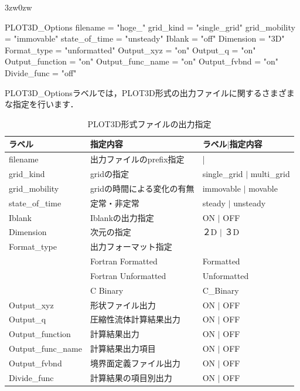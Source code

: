 \begin{indentation}{3zw}{0zw}
\small

\begin{program}
  PLOT3D_Options {
    filename       = "hoge_"
    grid_kind      = "single_grid"
    grid_mobility  = "immovable"
    state_of_time  = "unsteady"
    Iblank         = "off"
    Dimension      = "3D"
    Format_type    = "unformatted"
    Output_xyz       = "on"
    Output_q         = "on"
    Output_function  = "on"
    Output_func_name = "on"
    Output_fvbnd     = "on"
    Divide_func      = "off"
  }
\end{program}


PLOT3D\_Optionsラベルでは，PLOT3D形式の出力ファイルに関するさまざまな指定を行います．


\begin{table}[htdp]
\caption{PLOT3D形式ファイルの出力指定}
\begin{center}
\small
\begin{tabular}{lll} \toprule
ラベル & 指定内容 & ラベル$|$指定内容\\ \midrule
filename & 出力ファイルのprefix指定  & |  \\ \hline
grid\_kind & gridの指定& single\_grid $|$ multi\_grid\\
grid\_mobility & gridの時間による変化の有無 & immovable $|$ movable\\
state\_of\_time & 定常・非定常 & steady $|$ unsteady\\
Iblank & Iblankの出力指定 & ON $|$ OFF\\
Dimension & 次元の指定 & ２D $|$ ３D\\ \hline
Format\_type & 出力フォーマット指定 & \\
 & Fortran Formatted & Formatted \\
 & Fortran Unformatted & Unformatted \\
 & C Binary & C\_Binary \\ \hline
Output\_xyz & 形状ファイル出力 & ON $|$ OFF\\
Output\_q & 圧縮性流体計算結果出力 & ON $|$ OFF\\
Output\_function & 計算結果出力 & ON $|$ OFF\\
Output\_func\_name & 計算結果出力項目 & ON $|$ OFF\\
Output\_fvbnd & 境界面定義ファイル出力 & ON $|$ OFF\\
Divide\_func & 計算結果の項目別出力 & ON $|$ OFF\\\bottomrule
\end{tabular}
\end{center}
\label{tbl:log_output}
\end{table}



\end{indentation}
